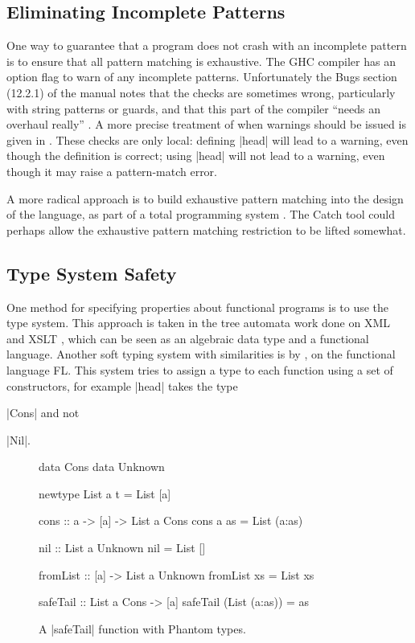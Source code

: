\documentclass[preprint]{sigplanconf}
\begin{document}
\subsection{Eliminating Incomplete Patterns}

One way to guarantee that a program does not crash with an incomplete pattern is to ensure that all pattern matching is exhaustive. The GHC compiler \cite{ghc} has an option flag to warn of any incomplete patterns. Unfortunately the Bugs section (12.2.1) of the manual notes that the checks are sometimes wrong, particularly with string patterns or guards, and that this part of the compiler ``needs an overhaul really'' \cite{ghc}. A more precise treatment of when warnings should be issued is given in \citet{maranget:pattern_warnings}. These checks are only local: defining |head| will lead to a warning, even though the definition is correct; using |head| will not lead to a warning, even though it may raise a pattern-match error.

A more radical approach is to build exhaustive pattern matching into the design of the language, as part of a total programming system \cite{turner:total}. The Catch tool could perhaps allow the exhaustive pattern matching restriction to be lifted somewhat.


\subsection{Type System Safety}

One method for specifying properties about functional programs is to use the type system. This approach is taken in the tree automata work done on XML and XSLT \cite{static_xslt}, which can be seen as an algebraic data type and a functional language. Another soft typing system with similarities is by \citet{aiken:type_infer}, on the functional language FL. This system tries to assign a type to each function using a set of constructors, for example |head| takes the type \ignore|Cons| and not \ignore|Nil|.

\begin{figure}
\begin{code}
data Cons
data Unknown

newtype List a t = List [a]

cons :: a -> [a] -> List a Cons
cons a as = List (a:as)

nil :: List a Unknown
nil = List []

fromList :: [a] -> List a Unknown
fromList xs = List xs

safeTail :: List a Cons -> [a]
safeTail (List (a:as)) = as
\end{code}
\caption{A |safeTail| function with Phantom types.}
\label{fig:phantom}
\end{figure}
\end{document}
